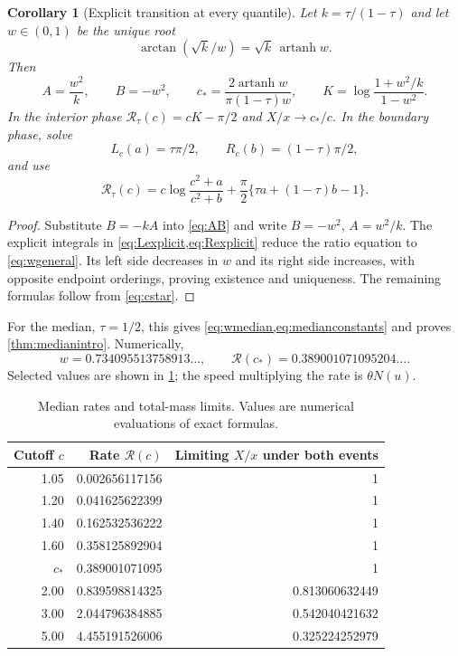 \documentclass[11pt,letterpaper]{article}
\numberwithin{equation}{section}
\newtheorem{corollary}[theorem]{Corollary}
\theoremstyle{definition}
\theoremstyle{remark}
\newcommand{\arctanh}{\operatorname{artanh}}
\newcommand{\rate}{\mathcal R_\tau}
\newcommand{\mrate}{\mathcal R}
\begin{document}
\begin{corollary}[Explicit transition at every quantile]\label{cor:explicit}
Let $k=\tau/(1-\tau)$ and let $w\in(0,1)$ be the unique root
\begin{equation}\label{eq:wgeneral}
 \arctan(\sqrt k/w)=\sqrt k\,\arctanh w.
\end{equation}
Then
\begin{equation}\label{eq:explicit_constants}
 A=\frac{w^2}{k},\qquad B=-w^2,\qquad
 c_* =\frac{2\arctanh w}{\pi(1-\tau)w},\qquad
 K=\log\frac{1+w^2/k}{1-w^2}.
\end{equation}
In the interior phase $\rate(c)=cK-\pi/2$ and $X/x\to c_*/c$. In the boundary phase, solve
\[
 L_c(a)=\tau\pi/2,\qquad R_c(b)=(1-\tau)\pi/2,
\]
and use
\begin{equation}\label{eq:explicit_boundary}
 \rate(c)=c\log\frac{c^2+a}{c^2+b}
 +\frac\pi2\{\tau a+(1-\tau)b-1\}.
\end{equation}
\end{corollary}

\begin{proof}
Substitute $B=-kA$ into \cref{eq:AB} and write $B=-w^2$, $A=w^2/k$. The explicit integrals in \cref{eq:Lexplicit,eq:Rexplicit} reduce the ratio equation to \cref{eq:wgeneral}. Its left side decreases in $w$ and its right side increases, with opposite endpoint orderings, proving existence and uniqueness. The remaining formulas follow from \cref{eq:cstar}.
\end{proof}

For the median, $\tau=1/2$, this gives \cref{eq:wmedian,eq:medianconstants} and proves \cref{thm:medianintro}. Numerically,
\[
 w=0.734095513758913\ldots,\qquad
 \mrate(c_*)=0.389001071095204\ldots.
\]
Selected values are shown in \cref{tab:rates}; the speed multiplying the rate is $\theta N(u)$.

\begin{table}[ht]
 \centering
 \caption{Median rates and total-mass limits. Values are numerical evaluations of exact formulas.}
 \label{tab:rates}
 \begin{tabular}{@{}rrr@{}}
 \toprule
 Cutoff $c$ & Rate $\mrate(c)$ & Limiting $X/x$ under both events \\
 \midrule
 1.05 & 0.002656117156 & 1 \\
 1.20 & 0.041625622399 & 1 \\
 1.40 & 0.162532536222 & 1 \\
 1.60 & 0.358125892904 & 1 \\
 $c_*$ & 0.389001071095 & 1 \\
 2.00 & 0.839598814325 & 0.813060632449 \\
 3.00 & 2.044796384885 & 0.542040421632 \\
 5.00 & 4.455191526006 & 0.325224252979 \\
 \bottomrule
 \end{tabular}
\end{table}
\end{document}
